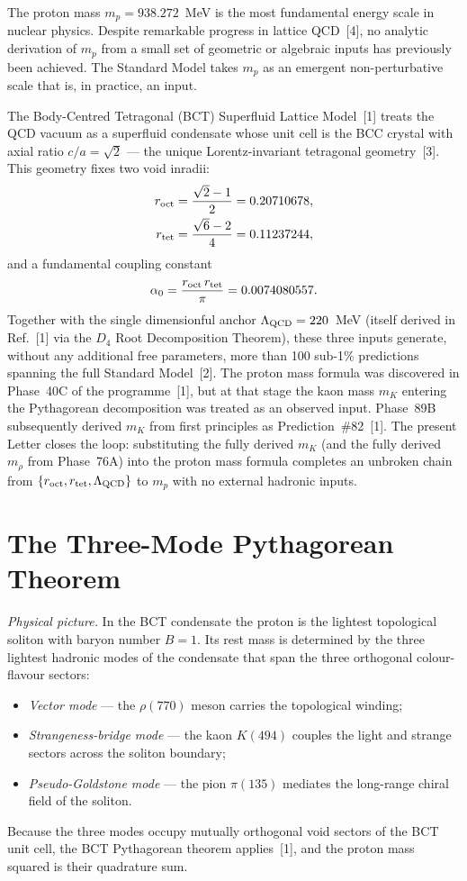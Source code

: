 \documentclass[10pt,twocolumn]{article}
\begin{document}
The proton mass $m_p = 938.272$~MeV is the most fundamental energy scale in nuclear physics.
Despite remarkable progress in lattice QCD~[4], no analytic derivation of $m_p$ from a small
set of geometric or algebraic inputs has previously been achieved. The Standard Model takes
$m_p$ as an emergent non-perturbative scale that is, in practice, an input.

The Body-Centred Tetragonal (BCT) Superfluid Lattice Model~[1] treats the QCD vacuum as a
superfluid condensate whose unit cell is the BCC crystal with axial ratio $c/a = \sqrt{2}$ ---
the unique Lorentz-invariant tetragonal geometry~[3]. This geometry fixes two void inradii:
\begin{align}
r_{\rm oct} &= \frac{\sqrt{2}-1}{2} = 0.20710678, \notag\\
r_{\rm tet} &= \frac{\sqrt{6}-2}{4} = 0.11237244,
\label{eq:radii}
\end{align}
and a fundamental coupling constant
\begin{equation}
\alpha_0 = \frac{r_{\rm oct}\,r_{\rm tet}}{\pi} = 0.0074080557.
\label{eq:alpha0}
\end{equation}
Together with the single dimensionful anchor $\Lambda_{\rm QCD} = 220$~MeV (itself derived in
Ref.~[1] via the $D_4$ Root Decomposition Theorem), these three inputs generate, without any
additional free parameters, more than 100 sub-1\% predictions spanning the full Standard
Model~[2]. The proton mass formula was discovered in Phase~40C of the programme~[1], but at
that stage the kaon mass $m_K$ entering the Pythagorean decomposition was treated as an
observed input. Phase~89B subsequently derived $m_K$ from first principles as Prediction~\#82~[1].
The present Letter closes the loop: substituting the fully derived $m_K$ (and the fully derived
$m_\rho$ from Phase~76A) into the proton mass formula completes an unbroken chain from
$\{r_{\rm oct}, r_{\rm tet}, \Lambda_{\rm QCD}\}$ to $m_p$ with no external hadronic inputs.

\section{The Three-Mode Pythagorean Theorem}

\textit{Physical picture.} In the BCT condensate the proton is the lightest topological soliton
with baryon number $B = 1$. Its rest mass is determined by the three lightest hadronic modes of
the condensate that span the three orthogonal colour-flavour sectors:
\begin{itemize}\setlength\itemsep{1pt}
\item \textit{Vector mode} --- the $\rho(770)$ meson carries the topological winding;
\item \textit{Strangeness-bridge mode} --- the kaon $K(494)$ couples the light and strange
  sectors across the soliton boundary;
\item \textit{Pseudo-Goldstone mode} --- the pion $\pi(135)$ mediates the long-range chiral
  field of the soliton.
\end{itemize}
Because the three modes occupy mutually orthogonal void sectors of the BCT unit cell, the BCT
Pythagorean theorem applies~[1], and the proton mass squared is their quadrature sum.
\end{document}
